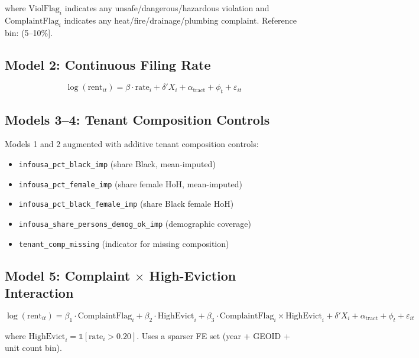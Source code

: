 \documentclass[
  11pt,
]{article}
\providecommand{\tightlist}{%
  \setlength{\itemsep}{0pt}\setlength{\parskip}{0pt}}
\begin{document}
where \(\text{ViolFlag}_i\) indicates any unsafe/dangerous/hazardous
violation and \(\text{ComplaintFlag}_i\) indicates any
heat/fire/drainage/plumbing complaint. Reference bin: (5--10\%{]}.

\subsection{Model 2: Continuous Filing
Rate}\label{model-2-continuous-filing-rate}

\[
\log(\text{rent}_{it}) = \beta \cdot \text{rate}_i + \delta' X_i + \alpha_{\text{tract}} + \phi_t + \varepsilon_{it}
\]

\subsection{Models 3--4: Tenant Composition
Controls}\label{models-34-tenant-composition-controls}

Models 1 and 2 augmented with additive tenant composition controls:

\begin{itemize}
\tightlist
\item
  \texttt{infousa\_pct\_black\_imp} (share Black, mean-imputed)
\item
  \texttt{infousa\_pct\_female\_imp} (share female HoH, mean-imputed)
\item
  \texttt{infousa\_pct\_black\_female\_imp} (share Black female HoH)
\item
  \texttt{infousa\_share\_persons\_demog\_ok\_imp} (demographic
  coverage)
\item
  \texttt{tenant\_comp\_missing} (indicator for missing composition)
\end{itemize}

\subsection{\texorpdfstring{Model 5: Complaint \(\times\) High-Eviction
Interaction}{Model 5: Complaint \textbackslash times High-Eviction Interaction}}\label{model-5-complaint-times-high-eviction-interaction}

\[
\log(\text{rent}_{it}) = \beta_1 \cdot \text{ComplaintFlag}_i + \beta_2 \cdot \text{HighEvict}_i + \beta_3 \cdot \text{ComplaintFlag}_i \times \text{HighEvict}_i + \delta' X_i + \alpha_{\text{tract}} + \phi_t + \varepsilon_{it}
\]

where \(\text{HighEvict}_i = \mathbb{1}[\text{rate}_i > 0.20]\). Uses a
sparser FE set (year + GEOID + unit count bin).
\end{document}
